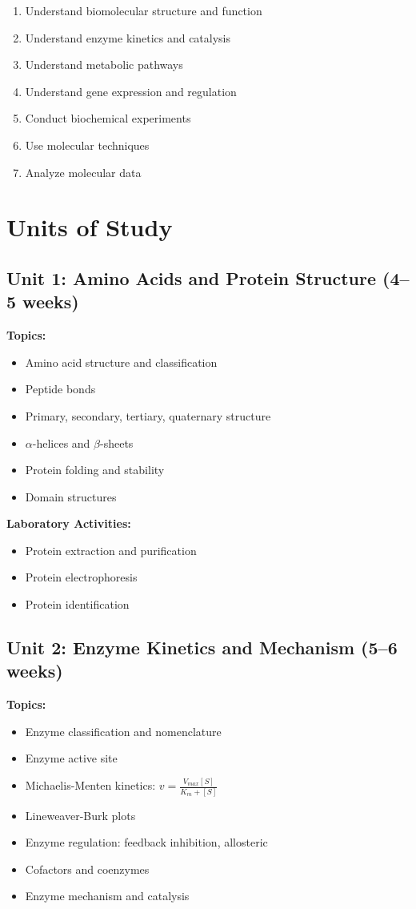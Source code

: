 \documentclass[12pt,oneside]{book}
\begin{document}
\begin{enumerate}
    \item Understand biomolecular structure and function
    \item Understand enzyme kinetics and catalysis
    \item Understand metabolic pathways
    \item Understand gene expression and regulation
    \item Conduct biochemical experiments
    \item Use molecular techniques
    \item Analyze molecular data
\end{enumerate}

\section{Units of Study}

\subsection{Unit 1: Amino Acids and Protein Structure (4--5 weeks)}

\textbf{Topics:}
\begin{itemize}
    \item Amino acid structure and classification
    \item Peptide bonds
    \item Primary, secondary, tertiary, quaternary structure
    \item $\alpha$-helices and $\beta$-sheets
    \item Protein folding and stability
    \item Domain structures
\end{itemize}

\textbf{Laboratory Activities:}
\begin{itemize}
    \item Protein extraction and purification
    \item Protein electrophoresis
    \item Protein identification
\end{itemize}

\subsection{Unit 2: Enzyme Kinetics and Mechanism (5--6 weeks)}

\textbf{Topics:}
\begin{itemize}
    \item Enzyme classification and nomenclature
    \item Enzyme active site
    \item Michaelis-Menten kinetics: $v = \frac{V_{max}[S]}{K_m + [S]}$
    \item Lineweaver-Burk plots
    \item Enzyme regulation: feedback inhibition, allosteric
    \item Cofactors and coenzymes
    \item Enzyme mechanism and catalysis
\end{itemize}
\end{document}
